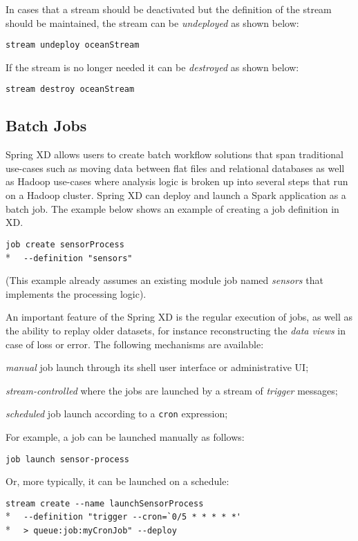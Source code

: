 In cases that a stream should be deactivated but the definition of the stream
should be maintained, the stream can be \emph{undeployed} as shown below:

\verb;stream undeploy oceanStream;

If the stream is no longer needed it can be \emph{destroyed} as shown below:

\verb;stream destroy oceanStream;

\subsection {Batch Jobs}

Spring XD allows users to create batch workflow solutions that span traditional
use-cases such as moving data between flat files and relational databases as
well as Hadoop use-cases where analysis logic is broken up into several steps
that run on a Hadoop cluster. Spring XD can deploy and launch a Spark application
as a batch job.  The example below shows an example of creating a
job definition in XD.

\verb;job create sensorProcess;\\*
\verb;  --definition "sensors";

(This example already assumes an existing module job named \emph{sensors} that
implements the processing logic).

An important feature of the Spring XD is the regular
execution of jobs, as well as the ability to replay older datasets, for
instance reconstructing the \emph{data views} in case of loss or error.
The following mechanisms are available:

\begin{itemize*}
\item \emph{manual} job launch through its shell user interface or
administrative UI;
\item \emph{stream-controlled} where the jobs are launched by a stream of
\emph{trigger} messages;
\item \emph{scheduled} job launch according to a \texttt{cron} expression;
\end{itemize*}

For example, a job can be launched manually as follows:

\verb;job launch sensor-process;

Or, more typically, it can be launched on a schedule:

\verb;stream create --name launchSensorProcess;\\*
\verb;  --definition "trigger --cron=`0/5 * * * * *';\\*
\verb;  > queue:job:myCronJob" --deploy;

